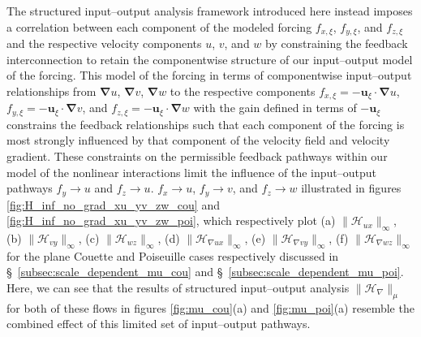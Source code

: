 The structured input--output analysis framework introduced here instead imposes a correlation between each component of the modeled forcing $f_{x,\xi}$, $f_{y,\xi}$, and $f_{z,\xi}$ and the respective velocity components $u$, $v$, and $w$ by constraining the feedback interconnection to retain the componentwise structure of our input--output model of the forcing. This model of the forcing in terms of componentwise input--output relationships from $\boldsymbol{\nabla} u$, $\boldsymbol{\nabla} v$, $\boldsymbol{\nabla} w$ to the respective components $f_{x,\xi}=-\boldsymbol{u}_{\xi}\cdot \boldsymbol{\nabla} u$, $f_{y,\xi}=-\boldsymbol{u}_{\xi}\cdot \boldsymbol{\nabla} v$, and $f_{z,\xi}=-\boldsymbol{u}_{\xi}\cdot \boldsymbol{\nabla} w$ with the gain defined in terms of $-\boldsymbol{u}_{\xi}$ constrains the feedback relationships such that  each component of the forcing 
is most strongly influenced by that component of the velocity field and velocity gradient. 
 These constraints on the permissible feedback pathways within our model of the nonlinear interactions limit the influence of the input--output pathways $f_y\rightarrow u$ and $f_z\rightarrow u$.  $f_x\rightarrow u$, $f_y\rightarrow v$, and $f_z\rightarrow w$  illustrated in figures \ref{fig:H_inf_no_grad_xu_yv_zw_cou} and  \ref{fig:H_inf_no_grad_xu_yv_zw_poi}, which respectively plot (a) $\|\mathcal{H}_{ux}\|_{\infty}$, (b) $\|\mathcal{H}_{vy}\|_{\infty}$, (c) $\|\mathcal{H}_{wz}\|_{\infty}$, (d) $\|\mathcal{H}_{\nabla ux}\|_{\infty}$, (e) $\|\mathcal{H}_{ \nabla vy}\|_{\infty}$, (f) $\|\mathcal{H}_{\nabla wz}\|_{\infty}$  for the plane Couette and Poiseuille cases respectively discussed in \S\ \ref{subsec:scale_dependent_mu_cou} and \S\ \ref{subsec:scale_dependent_mu_poi}. Here, we can see that the results of structured input--output analysis $\|\mathcal{H}_{\nabla}\|_{\mu}$ for both of these flows in figures \ref{fig:mu_cou}(a) and \ref{fig:mu_poi}(a) resemble the combined effect of this limited set of input--output pathways. 


